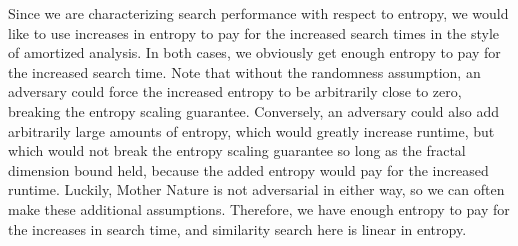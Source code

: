 \documentclass[review,preprint,12pt]{elsarticle}
\theoremstyle{definition}
\theoremstyle{remark}
\numberwithin{equation}{section}
\begin{document}
Since we are characterizing search performance with respect to entropy, we would like to use increases in entropy to pay for the increased search times in the style of amortized analysis.
In both cases, we obviously get enough entropy to pay for the increased search time.
Note that without the randomness assumption, an adversary could force the increased entropy to be arbitrarily close to zero, breaking the entropy scaling guarantee.
Conversely, an adversary could also add arbitrarily large amounts of entropy, which would greatly increase runtime, but which would not break the entropy scaling guarantee so long as the fractal dimension bound held, because the added entropy would pay for the increased runtime.
Luckily, Mother Nature is not adversarial in either way, so we can often make these additional assumptions. 
Therefore, we have enough entropy to pay for the increases in search time, and similarity search here is linear in entropy.
\end{document}
